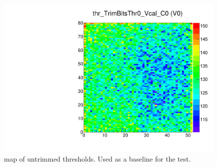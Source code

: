 


\begin{figure}[!htp]
\centering
\begin{minipage}{0.45\textwidth}
  \includegraphics[width=1.0\textwidth]{figures/trim_thr_TrimBitsThr0_Vcal.pdf}
  \caption{\roc map of untrimmed \vcal thresholds.
           Used as a baseline for the \trimbit test.}
  \label{fig:trim_thr_TrimBitsThr0_Vcal}
\end{minipage}
\end{figure}



